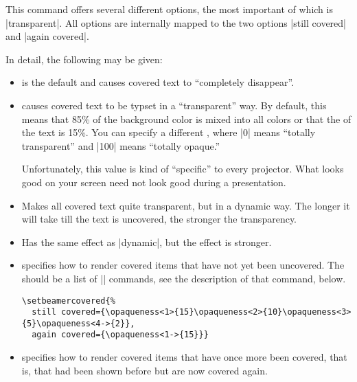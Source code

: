 \begin{command}{\setbeamercovered{}}
  This command offers several different options, the most important of
  which is |transparent|. All options are internally mapped to the two
  options |still covered| and |again covered|.

  In detail, the following  may be given:
  \begin{itemize}
  \item {} is the default and causes covered text
    to ``completely disappear''.
  \item {} causes
    covered text to be typset in a ``transparent'' way. By default,
    this means that 85\% of the background color is mixed into all
    colors or that the  of the text is 15\%. You can
    specify a different , where |0| means ``totally
    transparent'' and |100| means ``totally opaque.''

    Unfortunately, this value is kind of ``specific'' to every
    projector. What looks good on your screen need not look good
    during a presentation.
  \item {} Makes all covered text quite transparent,
    but in a dynamic way. The longer it will take till the text is
    uncovered, the stronger the transparency.
  \item {} Has the same effect as |dynamic|,
    but the effect is stronger.
  \item {} specifies  how
    to render covered items that have not yet been uncovered. The
     should be a list of |\opaqueness| commands,
    see the description of that command, below.
    \example
\begin{verbatim}
\setbeamercovered{%
  still covered={\opaqueness<1>{15}\opaqueness<2>{10}\opaqueness<3>{5}\opaqueness<4->{2}},
  again covered={\opaqueness<1->{15}}}
\end{verbatim}
  \item {} specifies how
    to render covered items that have once more been covered, that is,
    that had been shown before but are now covered again.
  \end{itemize}
\end{command}

